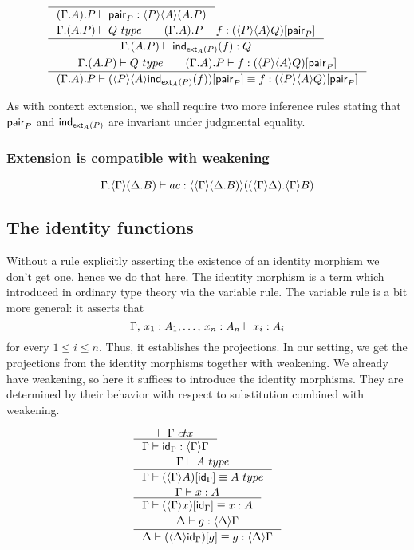 \begin{align}
& \inference{}
{\jterm{\ctxext{{\Gamma}{A}}{P}}{\ctxwk{P}{{A}{\ctxext{A}{P}}}}{\pair_P}}\\
& \inference{
  \jtype{\ctxext{\Gamma}{{A}{P}}}{Q}
  \qquad
  \jterm{\ctxext{{\Gamma}{A}}{P}}{\subst{\pair_P}{\ctxwk{P}{{A}{Q}}}}{f}}
  {\jterm{\ctxext{\Gamma}{{A}{P}}}{Q}{\ind{\tfext_A(P)}(f)}}\\
& \inference{
  \jtype{\ctxext{\Gamma}{{A}{P}}}{Q}
  \qquad
  \jterm{\ctxext{{\Gamma}{A}}{P}}{\subst{\pair_P}{\ctxwk{P}{{A}{Q}}}}{f}}
  {\jtermeq{\ctxext{{\Gamma}{A}}{P}}{\subst{\pair_P}{\ctxwk{P}{{A}{Q}}}}{\subst{\pair_P}{\ctxwk{P}{{A}{\ind{\tfext_A(P)}(f)}}}}{f}}
\end{align}

As with context extension, we shall require two more inference rules stating that
$\mathsf{pair}_P$ and $\mathsf{ind}_{\mathsf{ext}_A(P)}$ are invariant under judgmental equality.

\subsubsection{Extension is compatible with weakening}

\begin{equation*}
\jterm{\ctxext{\Gamma}{\ctxwk{\Gamma}{\ctxext{\Delta}{B}}}}{\ctxwk{{\Gamma}{\ctxext{\Delta}{B}}}{\ctxext{\ctxwk{\Gamma}{\Delta}}{\ctxwk{\Gamma}{B}}}}{ac}
\end{equation*}

\subsection{The identity functions}
Without a rule explicitly asserting the existence of an identity morphism we don't
get one, hence we do that here. The identity morphism is a term which introduced
in ordinary type theory via the variable rule. The variable rule is a bit more
general: it asserts that
\begin{equation*}
\jterm{\Gamma,\,x_1:A_1,\ldots,\,x_n:A_n}{A_i}{x_i}
\end{equation*}
for every $1\leq i\leq n$. Thus, it establishes the projections. In our setting,
we get the projections from the identity morphisms together with weakening. We
already have weakening, so here it suffices to introduce the identity morphisms.
They are determined by their behavior with respect to substitution combined with
weakening.

\begin{align}
&\inference{\jctx{\Gamma}}{\jterm{\Gamma}{\ctxwk{\Gamma}{\Gamma}}{\idfunc[\Gamma]}}\label{ctxIdFuncForm}\\
&\inference{\jtype{\Gamma}{A}}{\jtypeeq{\Gamma}{\subst{\idfunc[\Gamma]}{\ctxwk{\Gamma}{A}}}{A}}\label{ctxIdFuncPbInvType}\\
&\inference{\jterm{\Gamma}{A}{x}}{\jtermeq{\Gamma}{A}{\subst{\idfunc[\Gamma]}{\ctxwk{\Gamma}{x}}}{x}}\label{ctxIdFuncPbInvTerm}\\
&\inference{\jterm{\Delta}{\ctxwk{\Delta}{\Gamma}}{g}}{\jtermeq{\Delta}{\ctxwk{\Delta}{\Gamma}}{\subst{g}{\ctxwk{\Delta}{\idfunc[\Gamma]}}}{g}}\label{ctxIdFuncSubstInvTerm}
\end{align}

